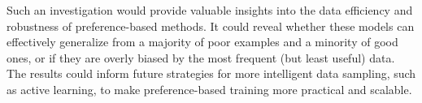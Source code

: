 \documentclass[a4paper,oneside,10pt,ngerman,english]{scrartcl}
\begin{document}
Such an investigation would provide valuable insights into the data efficiency and robustness of preference-based methods. It could reveal whether these models can effectively generalize from a majority of poor examples and a minority of good ones, or if they are overly biased by the most frequent (but least useful) data. The results could inform future strategies for more intelligent data sampling, such as active learning, to make preference-based training more practical and scalable.



\newpage
\printbibliography






\cleardoubleoddpage
\end{document}
